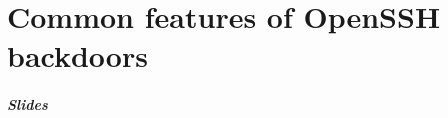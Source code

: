 \part{Common features of OpenSSH backdoors}

\begin{frame}
	\partpage
\end{frame}

\begin{frame}
	\frametitle{Slides}
\end{frame}
